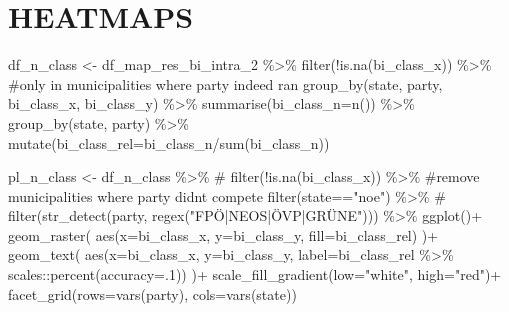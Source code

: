 \documentclass[
  letterpaper,
  DIV=11,
  numbers=noendperiod,
  oneside]{scrartcl}
\newenvironment{Shaded}{\begin{snugshade}}{\end{snugshade}}
\newcommand{\AttributeTok}[1]{\textcolor[rgb]{0.40,0.45,0.13}{#1}}
\newcommand{\CommentTok}[1]{\textcolor[rgb]{0.37,0.37,0.37}{#1}}
\newcommand{\DecValTok}[1]{\textcolor[rgb]{0.68,0.00,0.00}{#1}}
\newcommand{\FunctionTok}[1]{\textcolor[rgb]{0.28,0.35,0.67}{#1}}
\newcommand{\NormalTok}[1]{\textcolor[rgb]{0.00,0.23,0.31}{#1}}
\newcommand{\OtherTok}[1]{\textcolor[rgb]{0.00,0.23,0.31}{#1}}
\newcommand{\SpecialCharTok}[1]{\textcolor[rgb]{0.37,0.37,0.37}{#1}}
\newcommand{\StringTok}[1]{\textcolor[rgb]{0.13,0.47,0.30}{#1}}
\begin{document}
\hypertarget{heatmaps}{%
\section{HEATMAPS}\label{heatmaps}}

\begin{Shaded}
\begin{Highlighting}[]
\NormalTok{df\_n\_class }\OtherTok{\textless{}{-}}\NormalTok{ df\_map\_res\_bi\_intra\_2 }\SpecialCharTok{\%\textgreater{}\%} 
  \FunctionTok{filter}\NormalTok{(}\SpecialCharTok{!}\FunctionTok{is.na}\NormalTok{(bi\_class\_x)) }\SpecialCharTok{\%\textgreater{}\%}  \CommentTok{\#only in municipalities where party indeed ran}
  \FunctionTok{group\_by}\NormalTok{(state, party, bi\_class\_x, bi\_class\_y) }\SpecialCharTok{\%\textgreater{}\%} 
  \FunctionTok{summarise}\NormalTok{(}\AttributeTok{bi\_class\_n=}\FunctionTok{n}\NormalTok{()) }\SpecialCharTok{\%\textgreater{}\%} 
  \FunctionTok{group\_by}\NormalTok{(state, party) }\SpecialCharTok{\%\textgreater{}\%} 
  \FunctionTok{mutate}\NormalTok{(}\AttributeTok{bi\_class\_rel=}\NormalTok{bi\_class\_n}\SpecialCharTok{/}\FunctionTok{sum}\NormalTok{(bi\_class\_n))}


\NormalTok{pl\_n\_class }\OtherTok{\textless{}{-}}\NormalTok{ df\_n\_class }\SpecialCharTok{\%\textgreater{}\%} 
 \CommentTok{\# filter(!is.na(bi\_class\_x)) \%\textgreater{}\%  \#remove municipalities where party didn\textquotesingle{}t compete}
  \FunctionTok{filter}\NormalTok{(state}\SpecialCharTok{==}\StringTok{"noe"}\NormalTok{) }\SpecialCharTok{\%\textgreater{}\%} 
 \CommentTok{\# filter(str\_detect(party, regex("FPÖ|NEOS|ÖVP|GRÜNE"))) \%\textgreater{}\% }
  \FunctionTok{ggplot}\NormalTok{()}\SpecialCharTok{+}
  \FunctionTok{geom\_raster}\NormalTok{(}
    \FunctionTok{aes}\NormalTok{(}\AttributeTok{x=}\NormalTok{bi\_class\_x,}
        \AttributeTok{y=}\NormalTok{bi\_class\_y,}
        \AttributeTok{fill=}\NormalTok{bi\_class\_rel)}
\NormalTok{  )}\SpecialCharTok{+}
  \FunctionTok{geom\_text}\NormalTok{(}
    \FunctionTok{aes}\NormalTok{(}\AttributeTok{x=}\NormalTok{bi\_class\_x,}
    \AttributeTok{y=}\NormalTok{bi\_class\_y,}
    \AttributeTok{label=}\NormalTok{bi\_class\_rel }\SpecialCharTok{\%\textgreater{}\%}\NormalTok{ scales}\SpecialCharTok{::}\FunctionTok{percent}\NormalTok{(}\AttributeTok{accuracy=}\NormalTok{.}\DecValTok{1}\NormalTok{))}
\NormalTok{  )}\SpecialCharTok{+}
  \FunctionTok{scale\_fill\_gradient}\NormalTok{(}\AttributeTok{low=}\StringTok{"white"}\NormalTok{, }\AttributeTok{high=}\StringTok{"red"}\NormalTok{)}\SpecialCharTok{+}
  \FunctionTok{facet\_grid}\NormalTok{(}\AttributeTok{rows=}\FunctionTok{vars}\NormalTok{(party),}
             \AttributeTok{cols=}\FunctionTok{vars}\NormalTok{(state))}
\end{Highlighting}
\end{Shaded}
\end{document}
